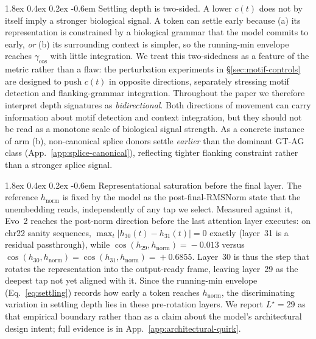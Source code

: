 \documentclass{article}
\makeatletter
\renewcommand\paragraph{\@startsection{paragraph}{4}{\z@}%
  {1.8ex \@plus 0.4ex \@minus 0.2ex}%
  {-0.6em}%
{\normalfont\normalsize\bfseries}}
\theoremstyle{plain}
\theoremstyle{definition}
\theoremstyle{remark}
\newcommand{\hnorm}{h_{\mathrm{norm}}}
\makeatother
\begin{document}
\paragraph{Settling depth is two-sided.} A lower $c(t)$ does not by itself imply a stronger biological signal. A token can settle early because (a) its representation is constrained by a biological grammar that the model commits to early, \emph{or} (b) its surrounding context is simpler, so the running-min envelope reaches $\gamma_{\cos}$ with little integration. We treat this two-sidedness as a feature of the metric rather than a flaw: the perturbation experiments in \S\ref{sec:motif-controls} are designed to push $c(t)$ in opposite directions, separately stressing motif detection and flanking-grammar integration. Throughout the paper we therefore interpret depth signatures as \emph{bidirectional}. Both directions of movement can carry information about motif detection and context integration, but they should not be read as a monotone scale of biological signal strength.
As a concrete instance of arm (b), non-canonical splice donors settle \emph{earlier} than the dominant GT-AG class (App.~\ref{app:splice-canonical}), reflecting tighter flanking constraint rather than a stronger splice signal.

\paragraph{Representational saturation before the final layer.} The reference $\hnorm$ is fixed by the model as the post-final-RMSNorm state that the unembedding reads, independently of any tap we select. Measured against it, Evo~2 reaches the post-norm direction before the last attention layer executes: on chr22 sanity sequences, $\max_{t}|h_{30}(t)\!-\!h_{31}(t)|\!=\!0$ exactly (layer~31 is a residual passthrough), while $\cos(h_{29},\hnorm)\!=\!-0.013$ versus $\cos(h_{30},\hnorm)\!=\!\cos(h_{31},\hnorm)\!=\!+0.6855$. Layer~30 is thus the step that rotates the representation into the output-ready frame, leaving layer~29 as the deepest tap not yet aligned with it. Since the running-min envelope (Eq.~\ref{eq:settling}) records how early a token reaches $\hnorm$, the discriminating variation in settling depth lies in these pre-rotation layers. We report $L^\star\!=\!29$ as that empirical boundary rather than as a claim about the model's architectural design intent; full evidence is in App.~\ref{app:architectural-quirk}.
\end{document}
